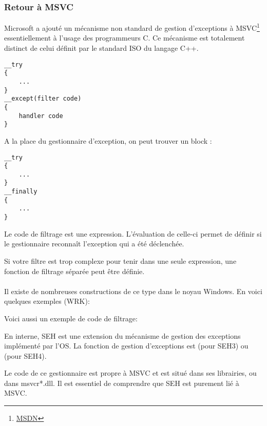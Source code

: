 ﻿\subsubsection{Retour à MSVC}


Microsoft a ajouté un mécanisme non standard de gestion d'exceptions à 
MSVC\footnote{\href{http://go.yurichev.com/17057}{MSDN}} essentiellement à l'usage des programmeurs C.
Ce mécanisme est totalement distinct de celui définit par le standard ISO du langage C++.

\begin{lstlisting}[style=customc]
__try
{
    ...
}
__except(filter code)
{
    handler code
}
\end{lstlisting}

A la place du gestionnaire d'exception, on peut trouver un block :

\begin{lstlisting}[style=customc]
__try
{
    ...
}
__finally
{
    ...
}
\end{lstlisting}

Le code de filtrage est une expression. L'évaluation de celle-ci permet de définir si le gestionnaire 
reconnaît l'exception qui a été déclenchée.

Si votre filtre est trop complexe pour tenir dans une seule expression, une fonction de filtrage 
séparée peut être définie.\\
\\
Il existe de nombreuses constructions de ce type dans le noyau Windows.
En voici quelques exemples (\ac{WRK}):





Voici aussi un exemple de code de filtrage:



En interne, SEH est une extension du mécanisme de gestion des exceptions implémenté par l'OS.
La fonction de gestion d'exceptions est  (pour SEH3) ou 
 (pour SEH4).

Le code de ce gestionnaire est propre à MSVC et est situé dans ses librairies, ou dans msvcr*.dll.
Il est essentiel de comprendre que SEH est purement lié à MSVC.

